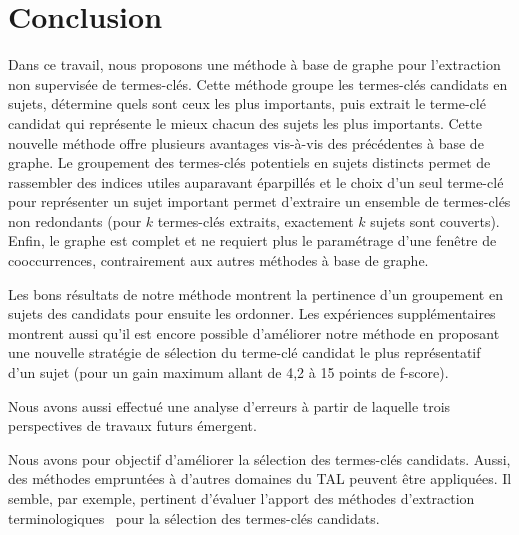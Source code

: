     \section{Conclusion}
    \label{sec:main-automatic_keyphrase_annotation-unsupervised_automatic_keyphrase_extraction-conclusion}
      Dans ce travail, nous proposons une méthode à base de graphe pour
      l'extraction non supervisée de termes-clés. Cette méthode groupe les
      termes-clés candidats en sujets, détermine quels sont ceux les plus
      importants, puis extrait le terme-clé candidat qui représente le mieux
      chacun des sujets les plus importants. Cette nouvelle méthode offre
      plusieurs avantages vis-à-vis des précédentes à base de graphe. Le
      groupement des termes-clés potentiels en sujets distincts permet de
      rassembler des indices utiles auparavant éparpillés et le choix d'un seul
      terme-clé pour représenter un sujet important permet d'extraire un
      ensemble de termes-clés non redondants (pour $k$ termes-clés extraits,
      exactement $k$ sujets sont couverts). Enfin, le graphe est complet et ne
      requiert plus le paramétrage d'une fenêtre de cooccurrences, contrairement
      aux autres méthodes à base de graphe.

      Les bons résultats de notre méthode montrent la pertinence d'un groupement
      en sujets des candidats pour ensuite les ordonner. Les expériences
      supplémentaires montrent aussi qu'il est encore possible d'améliorer notre
      méthode en proposant une nouvelle stratégie de sélection du terme-clé
      candidat le plus représentatif d'un sujet (pour un gain maximum allant de
      4,2 à 15 points de f-score).

      Nous avons aussi effectué une analyse d'erreurs à partir de laquelle trois
      perspectives de travaux futurs émergent.

      Nous avons pour objectif d'améliorer la sélection des termes-clés
      candidats. Aussi, des méthodes empruntées à d'autres domaines du TAL
      peuvent être appliquées. Il semble, par exemple, pertinent d'évaluer
      l'apport des méthodes d'extraction
      terminologiques~\cite{castellvi2001automatictermdetection} pour la
      sélection des termes-clés candidats.
      
